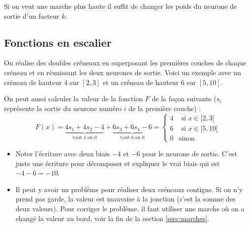 Si on veut une marche plus haute il suffit de changer les poids du neurone de sortie d'un facteur $k$.

\begin{center}
	\begin{minipage}{0.55\textwidth}
	\end{minipage}
	\begin{minipage}{0.35\textwidth}
	\end{minipage}
\end{center} 

\subsection{Fonctions en escalier}
On réalise des doubles créneaux en superposant les premières couches de chaque créneau et en réunissant les deux neurones de sortie. Voici un exemple avec un créneau de hauteur $4$ sur $[2,3]$ et un créneau de hauteur $6$ sur $[5,10]$.

\begin{center}
	\begin{minipage}{0.50\textwidth}
	\end{minipage}
	\begin{minipage}{0.45\textwidth}
	\end{minipage}
\end{center} 


On peut aussi calculer la valeur de la fonction $F$ de la façon suivante ($s_i$ représente la sortie du neurone numéro $i$ de la première couche) :
$$F(x) = \underbrace{4s_1+4s_2-4}_{\text{vaut $4$ ou $0$}} + \underbrace{6s_3+6s_4-6}_{\text{vaut $6$ ou $0$}} = 
\begin{cases}
	4 & \text{ si } x \in [2,3[ \\
	6 & \text{ si } x \in [5,10[ \\
	0 & \text {sinon}
\end{cases}
$$

	\begin{itemize}
		\item Noter l'écriture avec deux biais $-4$ et $-6$ pour le neurone de sortie. C'est juste une écriture pour décomposer et expliquer le \og{}vrai\fg{} biais qui est $-4-6 = -10$.
		
		\item Il peut y avoir un problème pour réaliser deux créneaux contigus. Si on n'y prend pas garde, la valeur est mauvaise à la jonction (c'est la somme des deux valeurs). Pour corriger le problème, il faut utiliser une marche où on a changé la valeur au bord, voir la fin de la section \ref{ssec:marches}.
		
		
	\end{itemize}

